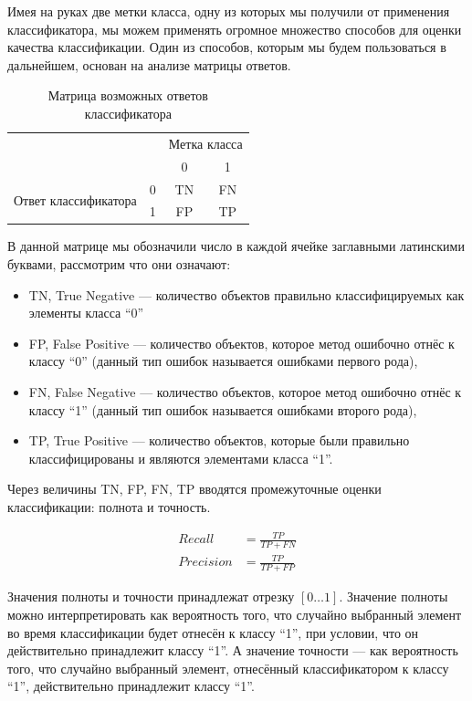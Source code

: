 Имея на руках две метки класса, одну из которых мы получили от применения классификатора, мы можем применять огромное множество способов для оценки качества классификации. Один из способов, которым мы будем пользоваться в дальнейшем, основан на анализе матрицы ответов.

\begin{table}[ht]
\caption{Матрица возможных ответов классификатора}
\label{tab_weight}
\centering
    \begin{tabular}{|c|c|c|c|}
    \hline \multicolumn{2}{|c|}{} & \multicolumn{2}{c|}{Метка класса} \\
    \cline {2-4} & & 0 & 1 \\
   	\hline \multirow{2}{*}{Ответ классификатора} &  0 & TN & FN \\
   	\cline {2-4} & 1 & FP & TP \\
    \hline
    \end{tabular}
\end{table}


В данной матрице мы обозначили число в каждой ячейке заглавными латинскими буквами, рассмотрим что они означают:
\begin{itemize}
\item  TN, True Negative — количество объектов правильно классифицируемых как элементы класса “0”
\item  FP, False Positive — количество объектов, которое метод ошибочно отнёс к классу “0” (данный тип ошибок называется ошибками первого рода),
\item  FN, False Negative — количество объектов, которое метод ошибочно отнёс к классу “1” (данный тип ошибок называется ошибками второго рода),
\item  TP, True Positive — количество объектов, которые были правильно классифицированы и являются элементами класса “1”.
\end{itemize}
Через величины TN, FP, FN, TP вводятся промежуточные оценки классификации: полнота и точность.

\begin{figure}[ht]
\begin{align}
Recall &= \frac{TP}{TP + FN} \\[0.5cm]
Precision &= \frac{TP}{TP + FP}
\end{align}
\end{figure}

Значения полноты и точности принадлежат отрезку $[0 \dots 1]$. Значение полноты можно интерпретировать как вероятность того, что случайно выбранный элемент во время классификации будет отнесён к классу “1”, при условии, что он действительно принадлежит классу “1”. А значение точности — как вероятность того, что случайно выбранный элемент, отнесённый классификатором к классу “1”, действительно принадлежит классу “1”.


